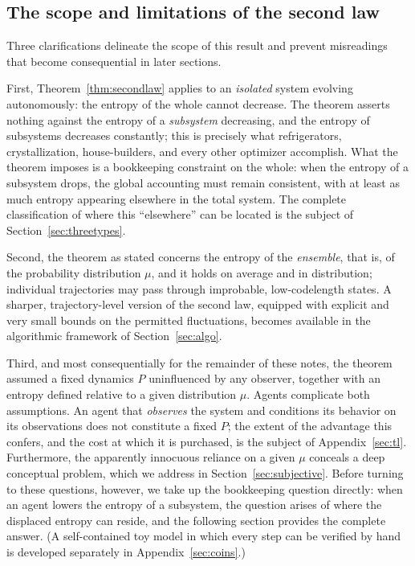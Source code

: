 \documentclass[10pt]{article}
\theoremstyle{definition}
\theoremstyle{remark}
\begin{document}
\subsection{The scope and limitations of the second law}
\label{sec:forbids}

Three clarifications delineate the scope of this result and prevent misreadings that become consequential in later sections.

First, Theorem~\ref{thm:secondlaw} applies to an \emph{isolated} system evolving autonomously: the entropy of the whole cannot decrease. The theorem asserts nothing against the entropy of a \emph{subsystem} decreasing, and the entropy of subsystems decreases constantly; this is precisely what refrigerators, crystallization, house-builders, and every other optimizer accomplish. What the theorem imposes is a bookkeeping constraint on the whole: when the entropy of a subsystem drops, the global accounting must remain consistent, with at least as much entropy appearing elsewhere in the total system. The complete classification of where this ``elsewhere'' can be located is the subject of Section~\ref{sec:threetypes}.

Second, the theorem as stated concerns the entropy of the \emph{ensemble}, that is, of the probability distribution $\mu$, and it holds on average and in distribution; individual trajectories may pass through improbable, low-codelength states. A sharper, trajectory-level version of the second law, equipped with explicit and very small bounds on the permitted fluctuations, becomes available in the algorithmic framework of Section~\ref{sec:algo}.

Third, and most consequentially for the remainder of these notes, the theorem assumed a fixed dynamics $P$ uninfluenced by any observer, together with an entropy defined relative to a given distribution $\mu$. Agents complicate both assumptions. An agent that \emph{observes} the system and conditions its behavior on its observations does not constitute a fixed $P$; the extent of the advantage this confers, and the cost at which it is purchased, is the subject of Appendix~\ref{sec:tl}. Furthermore, the apparently innocuous reliance on a given $\mu$ conceals a deep conceptual problem, which we address in Section~\ref{sec:subjective}. Before turning to these questions, however, we take up the bookkeeping question directly: when an agent lowers the entropy of a subsystem, the question arises of where the displaced entropy can reside, and the following section provides the complete answer. (A self-contained toy model in which every step can be verified by hand is developed separately in Appendix~\ref{sec:coins}.)
\end{document}
